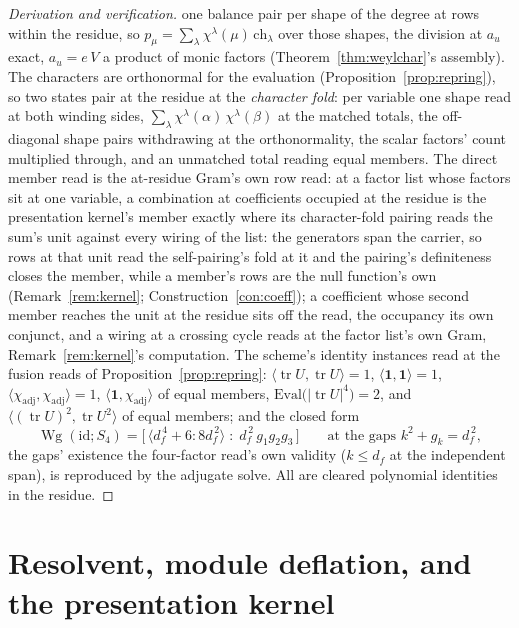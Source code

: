 \documentclass[11pt]{article}
\theoremstyle{definition}
\newcommand{\tr}{\operatorname{tr}}
\newcommand{\Wg}{\operatorname{Wg}}
\begin{document}
\begin{proof}[Derivation and verification]
one balance pair per shape of the degree at rows within the
residue, so $p_\mu=\sum_\lambda\chi^\lambda(\mu)\,\mathrm{ch}_\lambda$
over those shapes, the division at $a_u$ exact, $a_u=e\,V$ a
product of monic factors (Theorem~\ref{thm:weylchar}'s assembly).
The characters are orthonormal for the evaluation
(Proposition~\ref{prop:repring}), so two states pair at the
residue at the \emph{character fold}: per variable one shape read
at both winding sides,
$\sum_\lambda\chi^\lambda(\alpha)\,\chi^\lambda(\beta)$ at the
matched totals, the off-diagonal shape pairs withdrawing at the
orthonormality, the scalar factors' count multiplied through, and
an unmatched total reading equal members. The direct member read
is the at-residue Gram's own row read: at a factor list whose
factors sit at one variable, a combination at coefficients
occupied at the residue is the presentation kernel's member
exactly where its character-fold pairing reads the sum's unit
against every wiring of the list: the generators span the
carrier, so rows at that unit read the self-pairing's fold at it
and the pairing's definiteness closes the member, while
a member's rows are the null function's own
(Remark~\ref{rem:kernel}; Construction~\ref{con:coeff}); a
coefficient whose second member reaches the unit at the residue
sits off the read, the occupancy its own conjunct, and a wiring
at a crossing cycle reads at the factor list's own Gram,
Remark~\ref{rem:kernel}'s computation. The
scheme's identity instances read at the fusion
reads of
Proposition~\ref{prop:repring}:
$\langle\tr U,\tr U\rangle=1$, $\langle\mathbf1,\mathbf1
\rangle=1$, $\langle\chi_{\mathrm{adj}},\chi_{\mathrm{adj}}\rangle=1$,
$\langle\mathbf1,\chi_{\mathrm{adj}}\rangle$ of equal members,
$\mathrm{Eval}\big(|\tr U|^4\big)=2$, and
$\langle(\tr U)^2,\tr U^2\rangle$ of equal members; and the
closed form
\[
\Wg(\mathrm{id};S_4)=\big[\,\langle d_f^{\,4}+6:8d_f^{\,2}\rangle
\;:\;d_f^{\,2}\,g_1g_2g_3\,\big]
\qquad\text{at the gaps }k^2+g_k=d_f^{\,2},
\]
the gaps' existence the four-factor read's own validity ($k\le
d_f$ at the independent span), is reproduced by the adjugate solve. All are
cleared polynomial identities in the residue.
\end{proof}

\section{Resolvent, module deflation, and the presentation kernel}
\end{document}
